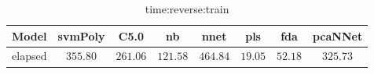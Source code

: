 \begin{table}[!ht]
	\centering
	\begin{tabular}{|c|c|c|c|c|c|c|c|}
		\hline
		Model & svmPoly & C5.0 & nb & nnet & pls & fda & pcaNNet \\ \hline
		elapsed & $355.80$ & $261.06$ & $121.58$ & $464.84$ & $19.05$ & $52.18$ & $325.73$ \\ \hline
	\end{tabular}
	\caption{time:reverse:train}
	\label{tab:time:reverse:train}
\end{table}
